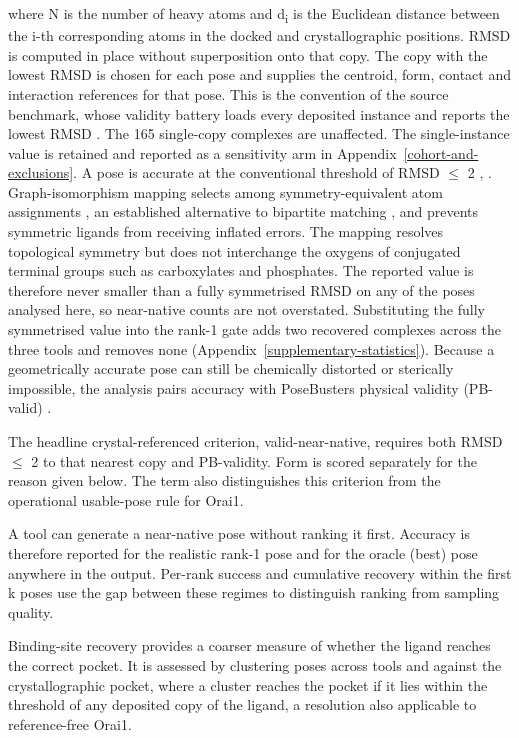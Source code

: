 where N is the number of heavy atoms and d\textsubscript{i} is the Euclidean distance between the i-th corresponding atoms in the docked and crystallographic positions. RMSD is computed in place without superposition onto that copy. The copy with the lowest RMSD is chosen for each pose and supplies the centroid, form, contact and interaction references for that pose. This is the convention of the source benchmark, whose validity battery loads every deposited instance and reports the lowest RMSD \cite{ref035}. The 165 single-copy complexes are unaffected. The single-instance value is retained and reported as a sensitivity arm in Appendix~\ref{cohort-and-exclusions}. A pose is accurate at the conventional threshold of RMSD \ensuremath{\leq} 2\angstrom{} \cite{ref022}, \cite{ref050}. Graph-isomorphism mapping selects among symmetry-equivalent atom assignments \cite{ref044}, an established alternative to bipartite matching \cite{ref048}, and prevents symmetric ligands from receiving inflated errors. The mapping resolves topological symmetry but does not interchange the oxygens of conjugated terminal groups such as carboxylates and phosphates. The reported value is therefore never smaller than a fully symmetrised RMSD on any of the poses analysed here, so near-native counts are not overstated. Substituting the fully symmetrised value into the rank-1 gate adds two recovered complexes across the three tools and removes none (Appendix~\ref{supplementary-statistics}). Because a geometrically accurate pose can still be chemically distorted or sterically impossible, the analysis pairs accuracy with PoseBusters physical validity (PB-valid) \cite{ref035}.

The headline crystal-referenced criterion, valid-near-native, requires both RMSD \ensuremath{\leq} 2\angstrom{} to that nearest copy and PB-validity. Form is scored separately for the reason given below. The term also distinguishes this criterion from the operational usable-pose rule for Orai1.

A tool can generate a near-native pose without ranking it first. Accuracy is therefore reported for the realistic rank-1 pose and for the oracle (best) pose anywhere in the output. Per-rank success and cumulative recovery within the first k poses use the gap between these regimes to distinguish ranking from sampling quality.

Binding-site recovery provides a coarser measure of whether the ligand reaches the correct pocket. It is assessed by clustering poses across tools and against the crystallographic pocket, where a cluster reaches the pocket if it lies within the threshold of any deposited copy of the ligand, a resolution also applicable to reference-free Orai1.

